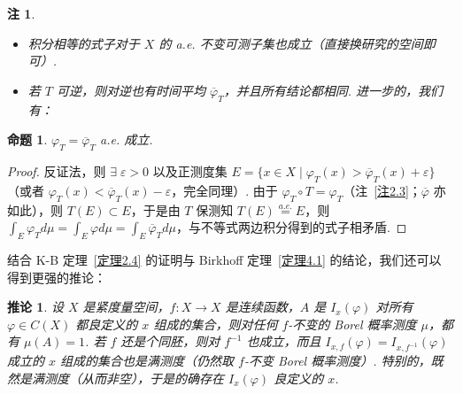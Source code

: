 \documentclass[11pt, a4paper, oneside]{ctexart}
\newtheorem{corollary}[theorem]{推论}
\newtheorem{proposition}[theorem]{命题}
\newtheorem{remark}[theorem]{注}
\begin{document}
    \begin{remark}
        \begin{itemize}
            \item 积分相等的式子对于 $X$ 的 a.e. 不变可测子集也成立（直接换研究的空间即可）.
            \item 若 $T$ 可逆，则对逆也有时间平均 $\overline{\varphi}_T$，并且所有结论都相同. 进一步的，我们有：
        \end{itemize}
    \end{remark}
    \begin{proposition}
        $\varphi_T=\overline{\varphi}_T$ a.e. 成立.
    \end{proposition}
    \begin{proof}
        反证法，则 $\exists\; \varepsilon>0$ 以及正测度集 $E=\{x\in X\mid\varphi_T(x)>\overline{\varphi}_T(x)+\varepsilon\}$（或者 $\varphi_T(x)<\overline{\varphi}_T(x)-\varepsilon$，完全同理）. 由于 $\varphi_T\circ T=\varphi_T$（注~\ref{注2.3}；$\overline{\varphi}$ 亦如此），则 $T(E)\subset E$，于是由 $T$ 保测知 $T(E)\stackrel{a.e.}{=}E$，则 $\int_{E}\varphi_T d\mu=\int_{E}\varphi d\mu=\int_{E}\overline{\varphi}_T d\mu$，与不等式两边积分得到的式子相矛盾.
    \end{proof}

    结合 K-B 定理~\ref{定理2.4} 的证明与 Birkhoff 定理~\ref{定理4.1} 的结论，我们还可以得到更强的推论：

    \begin{corollary}
        设 $X$ 是紧度量空间，$f:X\to X$ 是连续函数，$A$ 是 $I_x(\varphi)$ 对所有 $\varphi\in C(X)$ 都良定义的 $x$ 组成的集合，则对任何 $f$-不变的 Borel 概率测度 $\mu$，都有 $\mu(A)=1$. 若 $f$ 还是个同胚，则对 $f^{-1}$ 也成立，而且 $I_{x,f}(\varphi)=I_{x,f^{-1}}(\varphi)$ 成立的 $x$ 组成的集合也是满测度（仍然取 $f$-不变 Borel 概率测度）. 特别的，既然是满测度（从而非空），于是的确存在 $I_x(\varphi)$ 良定义的 $x$.
    \end{corollary}
\end{document}
